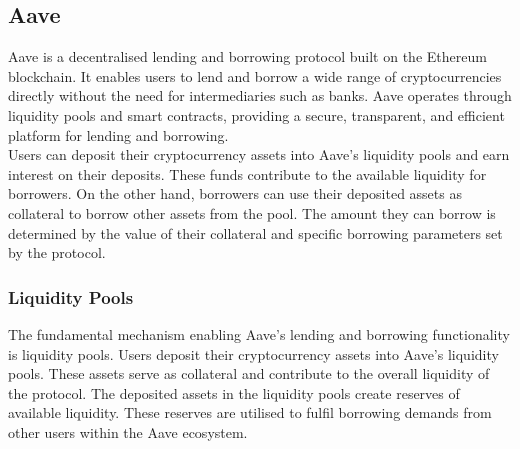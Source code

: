 \subsection{Aave}

Aave is a decentralised lending and borrowing protocol built on the Ethereum blockchain. It enables users to lend and borrow a wide range of cryptocurrencies directly without the need for intermediaries such as banks. Aave operates through liquidity pools and smart contracts, providing a secure, transparent, and efficient platform for lending and borrowing.
\\[3mm]
Users can deposit their cryptocurrency assets into Aave's liquidity pools and earn interest on their deposits. These funds contribute to the available liquidity for borrowers. On the other hand, borrowers can use their deposited assets as collateral to borrow other assets from the pool. The amount they can borrow is determined by the value of their collateral and specific borrowing parameters set by the protocol.
\subsubsection{Liquidity Pools}
The fundamental mechanism enabling Aave's lending and borrowing functionality is liquidity pools. Users deposit their cryptocurrency assets into Aave's liquidity pools. These assets serve as collateral and contribute to the overall liquidity of the protocol. The deposited assets in the liquidity pools create reserves of available liquidity. These reserves are utilised to fulfil borrowing demands from other users within the Aave ecosystem.
